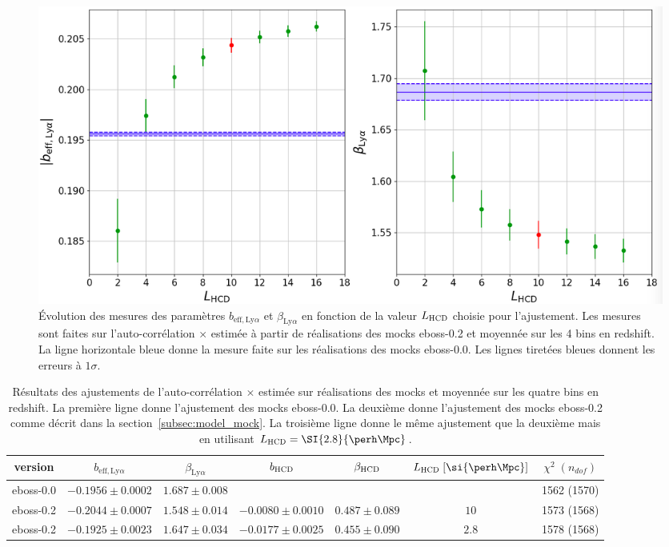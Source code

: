 \begin{figure}
  \centering
  \includegraphics[scale=0.33]{bias_lya_vs_L0}
  \caption{Évolution des mesures des paramètres $b_{\mathrm{eff},\mathrm{Ly}\alpha}$ et $\beta_{\mathrm{Ly}\alpha}$ en fonction de la valeur $L_{\textsc{HCD}}$ choisie pour l'ajustement.
    Les mesures sont faites sur l'auto-corrélation \lya{}$\times$\lya{} estimée à partir de \Nmocks{} réalisations des mocks eboss-0.2 et moyennée sur les 4 bins en redshift. La ligne horizontale bleue donne la mesure faite sur les \Nmocks{} réalisations des mocks eboss-0.0. Les lignes tiretées bleues donnent les erreurs à $1 \sigma$.}
  \label{fig:bias_lya_vs_L0}
\end{figure}

\begin{table}[]
  \centering
  \caption{Résultats des ajustements de l'auto-corrélation \lya{}$\times$\lya{} estimée sur \Nmocks{} réalisations des mocks et moyennée sur les quatre bins en redshift. La première ligne donne l'ajustement des mocks eboss-0.0. La deuxième donne l'ajustement des mocks eboss-0.2 comme décrit dans la section~\ref{subsec:model_mock}. La troisième ligne donne le même ajustement que la deuxième mais en utilisant $L_{\textsc{HCD}} = \SI{2.8}{\perh\Mpc}$.}
  \label{tab:cf_eboss02_L028}
  \footnotesize
  \begin{tabular}{ccccccc}
    \toprule
    version & $b_{\mathrm{eff},\mathrm{Ly}\alpha}$ & $\beta_{\mathrm{Ly}\alpha}$ & $b_{\textsc{HCD}}$ & $\beta_{\textsc{HCD}}$ & $L_{\textsc{HCD}}\;[\si{\perh\Mpc}]$ & $\chi^2 \; (n_{dof})$ \\
    \midrule
    eboss-0.0 & $-0.1956 \pm 0.0002$ & $1.687 \pm 0.008$ & & & & 1562 (1570) \\
    eboss-0.2 & $-0.2044 \pm 0.0007$ & $1.548 \pm 0.014$ & $-0.0080 \pm 0.0010$ & $0.487 \pm 0.089$ & $10$ & 1573 (1568) \\
    eboss-0.2 & $-0.1925 \pm 0.0023$ & $ 1.647 \pm 0.034$ &  $-0.0177 \pm 0.0025$ & $ 0.455 \pm 0.090$ & $2.8$ & 1578 (1568) \\ 
    \bottomrule
  \end{tabular}
\end{table}

